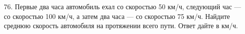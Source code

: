 76. Первые два часа автомобиль ехал со скоростью 50 км/ч, следующий час --- со скоростью 100 км/ч, а затем два часа --- со скоростью 75 км/ч. Найдите среднюю скорость автомобиля на протяжении всего пути. Ответ дайте в км/ч.\\
